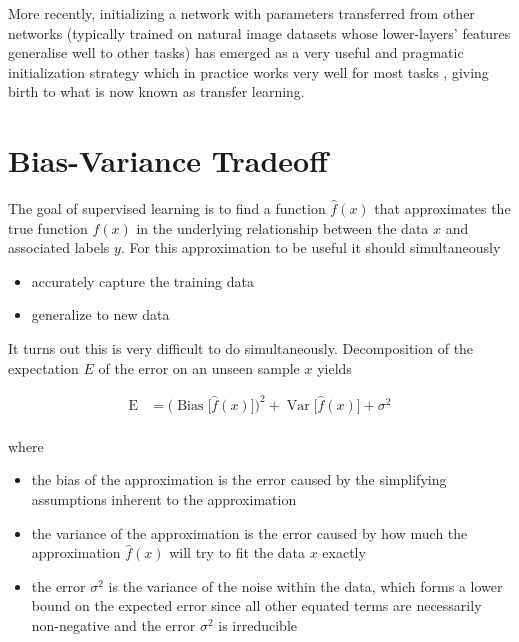 More recently, initializing a network with parameters transferred from other networks (typically trained on natural image datasets whose lower-layers' features generalise well to other tasks) has emerged as a very useful and pragmatic initialization strategy which in practice works very well for most tasks \cite{howtransferable}, giving birth to what is now known as transfer learning.

\section{Bias-Variance Tradeoff}

The goal of supervised learning is to find a function $\hat{f}(x)$ that approximates the true function $f(x)$ in the underlying relationship between the data $x$ and associated labels $y$. For this approximation to be useful it should simultaneously

\begin{itemize}
    \item accurately capture the training data
    \item generalize to new data
\end{itemize}

It turns out this is very difficult to do simultaneously. Decomposition of the expectation $E$ of the error on an unseen sample $x$ yields

$$
{\displaystyle {\begin{aligned}\operatorname {E} &={\Big (}\operatorname {Bias} {\big [}{\hat {f}}(x){\big ]}{\Big )}^{2}+\operatorname {Var} {\big [}{\hat {f}}(x){\big ]}+\sigma ^{2}\\\end{aligned}}}
$$

where

\begin{itemize}
    \item the bias of the approximation is the error caused by the simplifying assumptions inherent to the approximation
    \item the variance of the approximation is the error caused by how much the approximation $\hat{f}(x)$ will try to fit the data $x$ exactly
    \item the error $\sigma^2$ is the variance of the noise within the data, which forms a lower bound on the expected error since all other equated terms are necessarily non-negative and the error $\sigma^2$ is irreducible
\end{itemize}

